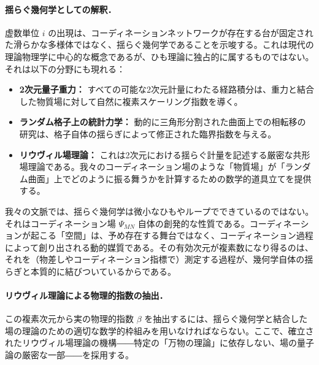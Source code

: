 \documentclass[11pt,a4paper]{article}
\theoremstyle{remark}
\begin{document}
	\paragraph{揺らぐ幾何学としての解釈．}
	虚数単位 \(i\) の出現は、コーディネーションネットワークが存在する台が固定された滑らかな多様体ではなく、揺らぐ幾何学であることを示唆する。これは現代の理論物理学に中心的な概念であるが、ひも理論に独占的に属するものではない。それは以下の分野にも現れる：
	\begin{itemize}
		\item \textbf{2次元量子重力：} すべての可能な2次元計量にわたる経路積分は、重力と結合した物質場に対して自然に複素スケーリング指数を導く。
		\item \textbf{ランダム格子上の統計力学：} 動的に三角形分割された曲面上での相転移の研究は、格子自体の揺らぎによって修正された臨界指数を与える。
		\item \textbf{リウヴィル場理論：} これは2次元における揺らぐ計量を記述する厳密な共形場理論である。我々のコーディネーション場のような「物質場」が「ランダム曲面」上でどのように振る舞うかを計算するための数学的道具立てを提供する。
	\end{itemize}
	我々の文脈では、揺らぐ幾何学は微小なひもやループでできているのではない。それはコーディネーション場 \(\Psi_{MN}\) 自体の創発的な性質である。コーディネーションが起こる「空間」は、予め存在する舞台ではなく、コーディネーション過程によって創り出される動的媒質である。その有効次元が複素数になり得るのは、それを（物差しやコーディネーション指標で）測定する過程が、幾何学自体の揺らぎと本質的に結びついているからである。
	
	\paragraph{リウヴィル理論による物理的指数の抽出．}
	この複素次元から実の物理的指数 \(\beta\) を抽出するには、揺らぐ幾何学と結合した場の理論のための適切な数学的枠組みを用いなければならない。ここで、確立されたリウヴィル場理論の機構――特定の「万物の理論」に依存しない、場の量子論の厳密な一部――を採用する。
	
\end{document}

